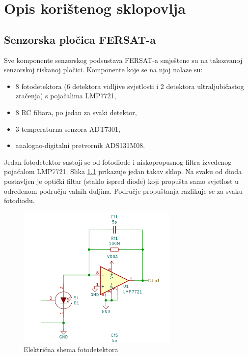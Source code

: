 \chapter{Opis korištenog sklopovlja}
    
    \section{Senzorska pločica FERSAT-a}
        Sve komponente senzorskog podsustava FERSAT-a smještene su na takozvanoj senzorskoj tiskanoj pločici. Komponente koje se na njoj nalaze su:
        \begin{itemize}
            \item 8 fotodetektora (6 detektora vidljive svjetlosti i 2 detektora ultraljubičastog zračenja) s pojačalima LMP7721,
            \item 8 RC filtara, po jedan za svaki detektor,
            \item 3 temperaturna senzora ADT7301,
            \item analogno-digitalni pretvornik ADS131M08.
        \end{itemize}

        Jedan fotodetektor sastoji se od fotodiode i niskopropusnog filtra izvedenog pojačalom LMP7721. Slika \ref{fig:fotosenzor} prikazuje jedan takav sklop. Na svaku od dioda postavljen je optički filtar (staklo ispred diode) koji propušta samo svjetlost u određenom području valnih duljina. Područje propuštanja razlikuje se za svaku fotodiodu.

        \begin{figure}[h]
            \centering
            \includegraphics[height=7cm]{slike/fotosenzor.png}
            \caption{Električna shema fotodetektora}
            \label{fig:fotosenzor}
        \end{figure}

